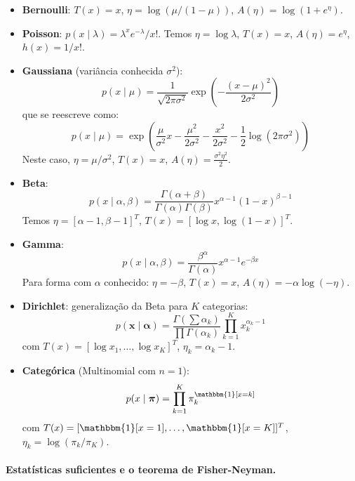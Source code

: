 \documentclass{tufte-handout}
\begin{document}
\begin{itemize}
    \item \textbf{Bernoulli}: $T(x) = x$, $\eta = \log(\mu/(1-\mu))$, $A(\eta) = \log(1+e^\eta)$.
    
    \item \textbf{Poisson}: $p(x \mid \lambda) = \lambda^x e^{-\lambda}/x!$. Temos $\eta = \log\lambda$, $T(x)=x$, $A(\eta) = e^\eta$, $h(x) = 1/x!$.
    
    \item \textbf{Gaussiana} (variância conhecida $\sigma^2$):
    \[
    p(x \mid \mu) = \frac{1}{\sqrt{2\pi\sigma^2}} \exp\!\left(-\frac{(x-\mu)^2}{2\sigma^2}\right)
    \]
    que se reescreve como:
    \[
    p(x \mid \mu) = \exp\!\left(\frac{\mu}{\sigma^2} x - \frac{\mu^2}{2\sigma^2} - \frac{x^2}{2\sigma^2} - \frac{1}{2}\log(2\pi\sigma^2)\right)
    \]
    Neste caso, $\eta = \mu/\sigma^2$, $T(x) = x$, $A(\eta) = \frac{\sigma^2\eta^2}{2}$.
    
    \item \textbf{Beta}:
    \[
    p(x \mid \alpha, \beta) = \frac{\Gamma(\alpha+\beta)}{\Gamma(\alpha)\Gamma(\beta)} x^{\alpha-1} (1-x)^{\beta-1}
    \]
    Temos $\eta = [\alpha-1, \beta-1]^T$, $T(x) = [\log x, \log(1-x)]^T$.
    
    \item \textbf{Gamma}:
    \[
    p(x \mid \alpha, \beta) = \frac{\beta^\alpha}{\Gamma(\alpha)} x^{\alpha-1} e^{-\beta x}
    \]
    Para forma com $\alpha$ conhecido: $\eta = -\beta$, $T(x) = x$, $A(\eta) = -\alpha\log(-\eta)$.
    
    \item \textbf{Dirichlet}: generalização da Beta para $K$ categorias:
    \[
    p(\mathbf{x} \mid \boldsymbol{\alpha}) = \frac{\Gamma(\sum \alpha_k)}{\prod \Gamma(\alpha_k)} \prod_{k=1}^K x_k^{\alpha_k-1}
    \]
    com $T(x) = [\log x_1, \dots, \log x_K]^T$, $\eta_k = \alpha_k - 1$.
    
    \item \textbf{Categórica} (Multinomial com $n=1$):
    \[
    p(x \mid \boldsymbol{\pi}) = \prod_{k=1}^K \pi_k^{\mathbbm{1}[x=k]}
    \]
    com $T(x) = [\mathbbm{1}[x=1], \dots, \mathbbm{1}[x=K]]^T$, $\eta_k = \log(\pi_k/\pi_K)$.
\end{itemize}

\paragraph{Estatísticas suficientes e o teorema de Fisher-Neyman.}
\end{document}
